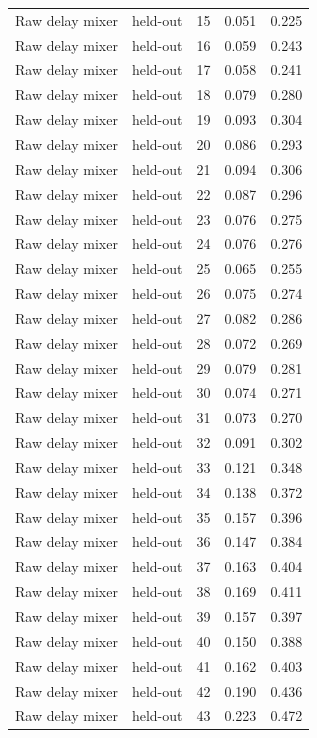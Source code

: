 \begin{tabular}{llrrr}
Raw delay mixer & held-out & 15 & 0.051 & 0.225 \\
Raw delay mixer & held-out & 16 & 0.059 & 0.243 \\
Raw delay mixer & held-out & 17 & 0.058 & 0.241 \\
Raw delay mixer & held-out & 18 & 0.079 & 0.280 \\
Raw delay mixer & held-out & 19 & 0.093 & 0.304 \\
Raw delay mixer & held-out & 20 & 0.086 & 0.293 \\
Raw delay mixer & held-out & 21 & 0.094 & 0.306 \\
Raw delay mixer & held-out & 22 & 0.087 & 0.296 \\
Raw delay mixer & held-out & 23 & 0.076 & 0.275 \\
Raw delay mixer & held-out & 24 & 0.076 & 0.276 \\
Raw delay mixer & held-out & 25 & 0.065 & 0.255 \\
Raw delay mixer & held-out & 26 & 0.075 & 0.274 \\
Raw delay mixer & held-out & 27 & 0.082 & 0.286 \\
Raw delay mixer & held-out & 28 & 0.072 & 0.269 \\
Raw delay mixer & held-out & 29 & 0.079 & 0.281 \\
Raw delay mixer & held-out & 30 & 0.074 & 0.271 \\
Raw delay mixer & held-out & 31 & 0.073 & 0.270 \\
Raw delay mixer & held-out & 32 & 0.091 & 0.302 \\
Raw delay mixer & held-out & 33 & 0.121 & 0.348 \\
Raw delay mixer & held-out & 34 & 0.138 & 0.372 \\
Raw delay mixer & held-out & 35 & 0.157 & 0.396 \\
Raw delay mixer & held-out & 36 & 0.147 & 0.384 \\
Raw delay mixer & held-out & 37 & 0.163 & 0.404 \\
Raw delay mixer & held-out & 38 & 0.169 & 0.411 \\
Raw delay mixer & held-out & 39 & 0.157 & 0.397 \\
Raw delay mixer & held-out & 40 & 0.150 & 0.388 \\
Raw delay mixer & held-out & 41 & 0.162 & 0.403 \\
Raw delay mixer & held-out & 42 & 0.190 & 0.436 \\
Raw delay mixer & held-out & 43 & 0.223 & 0.472 \\

\end{tabular}
